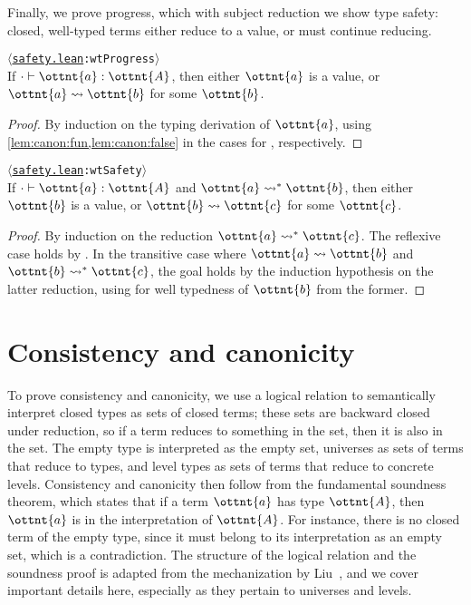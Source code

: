 \documentclass[a4paper,UKenglish,cleveref,autoref,thm-restate]{lipics-v2021}
\newcommand{\citep}[1]{\cite{#1}}
\newcommand{\repo}{https://github.com/ionathanch/TTBFL}
\newcommand{\thmref}[2]{%
  $\langle$\href{\repo/tree/main/src/#1}{\texttt{#1}}\texttt{:#2}$\rangle$%
}
\begin{document}
Finally, we prove progress, which with subject reduction we show type safety:
closed, well-typed terms either reduce to a value, or must continue reducing.

\begin{theorem}[Progress] \thmref{safety.lean}{wtProgress} \label{lem:progress} \\
  If $  \cdot   \vdash  \ottnt{a}  \mathrel{:}  \ottnt{A} $, then either $\ottnt{a}$ is a value,
  or $ \ottnt{a}  \rightsquigarrow  \ottnt{b} $ for some $\ottnt{b}$.
\end{theorem}

\begin{proof}
  By induction on the typing derivation of $\ottnt{a}$,
  using \cref{lem:canon:fun,lem:canon:false}
  in the cases for , respectively.
\end{proof}

\begin{theorem} \thmref{safety.lean}{wtSafety} \\
  If $  \cdot   \vdash  \ottnt{a}  \mathrel{:}  \ottnt{A} $ and $ \ottnt{a}  \rightsquigarrow^\ast  \ottnt{b} $,
  then either $\ottnt{b}$ is a value,
  or $ \ottnt{b}  \rightsquigarrow  \ottnt{c} $ for some $\ottnt{c}$.
\end{theorem}

\begin{proof}
  By induction on the reduction $ \ottnt{a}  \rightsquigarrow^\ast  \ottnt{c} $.
  The reflexive case holds by .
  In the transitive case where $ \ottnt{a}  \rightsquigarrow  \ottnt{b} $ and $ \ottnt{b}  \rightsquigarrow^\ast  \ottnt{c} $,
  the goal holds by the induction hypothesis on the latter reduction,
  using  for well typedness of $\ottnt{b}$
  from the former.
\end{proof}
\fi

\section{Consistency and canonicity} \label{sec:lr}

To prove consistency and canonicity,
we use a logical relation to semantically interpret closed types as sets of closed terms;
these sets are backward closed under reduction,
so if a term reduces to something in the set, then it is also in the set.
The empty type is interpreted as the empty set,
universes as sets of terms that reduce to types,
and level types as sets of terms that reduce to concrete levels.
Consistency and canonicity then follow from the fundamental soundness theorem,
which states that if a term $\ottnt{a}$ has type $\ottnt{A}$,
then $\ottnt{a}$ is in the interpretation of $\ottnt{A}$.
For instance, there is no closed term of the empty type,
since it must belong to its interpretation as an empty set, which is a contradiction.
The structure of the logical relation and the soundness proof
is adapted from the mechanization by Liu~\citep{lr-pearl},
and we cover important details here,
especially as they pertain to universes and levels.
\end{document}
